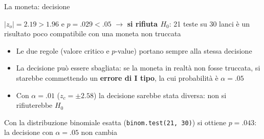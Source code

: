 \documentclass[
  ignorenonframetext,
  compress, aspectratio=149]{beamer}
\providecommand{\tightlist}{%
  \setlength{\itemsep}{0pt}\setlength{\parskip}{0pt}}
\begin{document}
\begin{frame}[fragile]{La moneta: decisione}
\label{la-moneta-decisione}
\small

\begin{tcolorbox}[enhanced jigsaw, opacityback=0, bottomtitle=1mm, bottomrule=.15mm, titlerule=0mm, coltitle=black, toprule=.15mm, breakable, toptitle=1mm, colbacktitle=quarto-callout-important-color!10!white, arc=.35mm, title={Decisione}, rightrule=.15mm, leftrule=.75mm, opacitybacktitle=0.6, left=2mm, colframe=quarto-callout-important-color-frame, colback=white]

\(|z_o| = 2.19 > 1.96\) e \(p = .029 < .05\) \(\rightarrow\) \textbf{si
rifiuta \(H_0\)}: 21 teste su 30 lanci è un risultato poco compatibile
con una moneta non truccata

\end{tcolorbox}

\vspace{2mm}

\begin{itemize}
\tightlist
\item
  Le due regole (valore critico e \(p\)-value) portano sempre alla
  stessa decisione
\item
  La decisione può essere sbagliata: se la moneta in realtà non fosse
  truccata, si starebbe commettendo un \textbf{errore di I tipo}, la cui
  probabilità è \(\alpha = .05\)
\item
  Con \(\alpha = .01\) (\(z_c = \pm 2.58\)) la decisione sarebbe stata
  diversa: non si rifiuterebbe \(H_0\)
\end{itemize}

\vspace{2mm}

\footnotesize

Con la distribuzione binomiale esatta (\texttt{binom.test(21,\ 30)}) si
ottiene \(p = .043\): la decisione con \(\alpha = .05\) non cambia
\end{frame}
\end{document}
